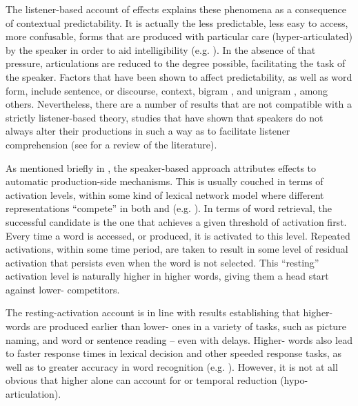 The listener-based account of  effects explains these phenomena
as a consequence of contextual predictability. It is actually the
less predictable, less easy to access, more confusable, forms that
are produced with particular care (hyper-articulated) by the speaker
in order to aid intelligibility (e.g. \citealt{Aylett2004}). In
the absence of that pressure, articulations are reduced to the degree
possible, facilitating the task of the speaker. Factors that have
been shown to affect predictability, as well as word form, include
sentence, or discourse, context, bigram , and unigram ,
among others. Nevertheless, there are a number of results that are
not compatible with a strictly listener-based theory, studies that
have shown that speakers do not always alter their productions in
such a way as to facilitate listener comprehension (see \citealt{turnbull2015assessing}
for a review of the literature).

As mentioned briefly in , the
speaker-based approach attributes  effects to automatic production-side
mechanisms. This is usually couched in terms of activation levels,
within some kind of lexical network model where different representations
“compete” in both  and  (e.g. \citealp{mcclelland1981interactive,Dell1986}).
In terms of word retrieval, the successful candidate is the one that
achieves a given threshold of activation first. Every time a word
is accessed, or produced, it is activated to this level. Repeated
activations, within some time period, are taken to result in some
level of residual activation that persists even when the word is not
selected. This “resting” activation level is naturally higher
in higher  words, giving them a head start against lower-
competitors. 

The resting-activation account is in line with results establishing
that higher- words are produced earlier than lower-
ones in a variety of tasks, such as picture naming, and word or sentence
reading – even with delays. Higher- words also lead to faster
response times in lexical decision and other speeded response tasks,
as well as to greater accuracy in word recognition (e.g. \citealt{howes1951visual,balota1985locus,Luce1986,Marslen-Wilson1990}).
However, it is not at all obvious that higher  alone
can account for  or temporal reduction (hypo-articulation).


